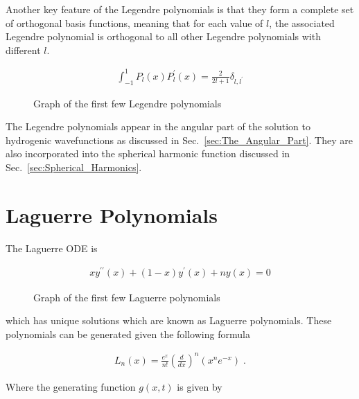         \noindent Another key feature of the Legendre polynomials is that they form a complete set of orthogonal basis functions, meaning that for each value of $l$, the associated Legendre polynomial is orthogonal to all other Legendre polynomials with different $l$.

        \begin{align}
            \int_{-1}^1 P_l(x) P_l^\prime(x) = \frac{2}{2l + 1}\delta_{l,l^\prime}
        \end{align}

        \begin{figure}[ht!]
            \centering
            \resizebox{0.8\linewidth}{!}{}
            \caption{Graph of the first few Legendre polynomials}
            \label{img:Legendre_polynomials}
        \end{figure}

        \noindent The Legendre polynomials appear in the angular part of the solution to hydrogenic wavefunctions as discussed in Sec.~\ref{sec:The_Angular_Part}. They are also incorporated into the spherical harmonic function discussed in Sec.~\ref{sec:Spherical_Harmonics}.

        \section{Laguerre Polynomials} \label{sec:Laguerre_Polynomial}
        The Laguerre ODE is 

        \begin{align}
            xy^{\prime \prime}(x) + (1 - x)y^\prime(x) + ny(x) = 0 
        \end{align}


        \begin{figure}[h]
            \centering
            \resizebox{0.8\linewidth}{!}{}
            \caption{Graph of the first few Laguerre polynomials}
            \label{img:Laguerre_polynomials}
        \end{figure}

        \noindent which has unique solutions which are known as Laguerre polynomials. These polynomials can be generated given the following formula 

        \begin{align}
            L_n(x) = \frac{e^x}{n!} \left( \frac{d}{dx} \right)^n (x^ne^{-x})\;.
        \end{align}

        \noindent Where the generating function $g(x, t)$ is given by \cite{Arfken_Weber_Arfken_Weber_2008}

